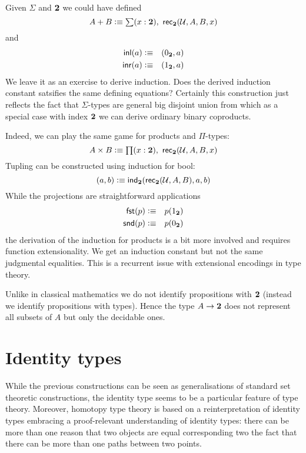 Given $\Sigma$ and $\mathbf{2}$ we could have defined
\[ A + B \defeq \sm{x:\bool} \rec{\bool}(\UU,A,B,x) \]
and
\begin{eqnarray*}
  \mathsf{inl}(a) & \vcentcolon\equiv & ( 0_{\mathbf{2}},a) \\
  \mathsf{inr}(a) & \vcentcolon\equiv & ( 1_{\mathbf{2}},a) \\
\end{eqnarray*}
We leave it as an exercise to derive induction. Does the derived
induction constant satsifies the same defining equations?
Certainly this construction just reflects the fact that
$\Sigma$-types are general big disjoint union from which as a
special case with index $\mathbf{2}$ we can derive ordinary binary
coproducts. 

Indeed, we can play the same game for products and $\Pi$-types:
\[ A \times B \defeq \prd{x:\bool}\rec{\bool}(\UU,A,B,x) \]
Tupling can be constructed using induction for bool:
\[ ( a,b) \vcentcolon\equiv \mathsf{ind}_{\mathbf{2}}(\mathsf{rec}_{\mathbf{2}}(\mathcal{U},A,B),a,b) \]
While the projections are straightforward applications
\begin{eqnarray*}
  \mathsf{fst}(p) & \vcentcolon\equiv & p(1_{\mathbf{2}}) \\
  \mathsf{snd}(p) & \vcentcolon\equiv & p(0_{\mathbf{2}}) \\
\end{eqnarray*}
the derivation of the induction for products is a bit more
involved and requires function extensionality. We get an
induction constant but not the same judgmental equalities.
This is a recurrent issue with extensional encodings in type
theory. 

Unlike in classical mathematics we
do not identify propositions with $\mathbf{2}$ (instead we identify
propositions with types). Hence the type $A \to \mathbf{2}$ does not
represent all subsets of $A$ but only the decidable ones.

\section{Identity types}
\label{sec:identity-types}

While the previous constructions can be seen as generalisations of
standard set theoretic constructions, the identity type seems to be
a particular feature of type theory. Moreover, homotopy type theory is
based on a reinterpretation of identity types embracing a
proof-relevant understanding of identity types: there can be more than
one reason that two objects are equal corresponding two the fact that
there can be more than one paths between two points.

